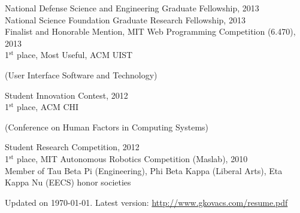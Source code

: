 \documentclass[margin,line]{resume}
\begin{document}
\begin{resume}
National Defense Science and Engineering Graduate Fellowship, 2013\\ %
National Science Foundation Graduate Research Fellowship, 2013\\ %
Finalist and Honorable Mention, MIT Web Programming Competition (6.470), 2013\\ %
1$^{\textrm{st}}$ place, Most Useful, ACM UIST \begin{small}(User Interface Software and Technology)\end{small} Student Innovation Contest, 2012\\
1$^{\textrm{st}}$ place, ACM CHI \begin{small}(Conference on Human Factors in Computing Systems)\end{small} Student Research Competition, 2012\\
1$^{\textrm{st}}$ place, MIT Autonomous Robotics Competition (Maslab), 2010\\
Member of Tau Beta Pi (Engineering), Phi Beta Kappa (Liberal Arts), Eta Kappa Nu (EECS) honor societies

\begin{small}
\begin{center}
Updated on \today. Latest version: \href{http://www.gkovacs.com/resume.pdf}{http://www.gkovacs.com/resume.pdf}
\end{center}
\end{small}

\end{resume}
\end{document}
